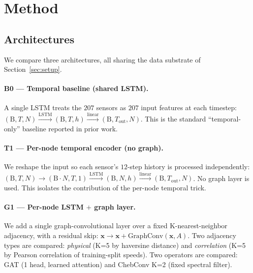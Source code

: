 \documentclass{article}
\begin{document}
\section{Method}
\label{sec:method}

\subsection{Architectures}
We compare three architectures, all sharing the data substrate of Section~\ref{sec:setup}.

\paragraph{B0 --- Temporal baseline (shared LSTM).}
A single LSTM treats the $207$ sensors as $207$ input features at each timestep:
$(\mathrm{B}, T, N) \xrightarrow{\text{LSTM}} (\mathrm{B}, T, h) \xrightarrow{\text{linear}} (\mathrm{B}, T_{\text{out}}, N)$.
This is the standard ``temporal-only'' baseline reported in prior work.

\paragraph{T1 --- Per-node temporal encoder (no graph).}
We reshape the input so each sensor's $12$-step history is processed independently:
$(\mathrm{B}, T, N) \to (\mathrm{B} \cdot N, T, 1) \xrightarrow{\text{LSTM}} (\mathrm{B}, N, h) \xrightarrow{\text{linear}} (\mathrm{B}, T_{\text{out}}, N)$.
No graph layer is used. This isolates the contribution of the per-node temporal trick.

\paragraph{G1 --- Per-node LSTM $+$ graph layer.}
We add a single graph-convolutional layer over a fixed K-nearest-neighbor adjacency, with a residual skip:
$\mathbf{x} \to \mathbf{x} + \mathrm{GraphConv}(\mathbf{x}, A)$.
Two adjacency types are compared: \emph{physical} (K=5 by haversine distance) and \emph{correlation} (K=5 by Pearson correlation of training-split speeds). Two operators are compared: GAT (1 head, learned attention) and ChebConv K=2 (fixed spectral filter).
\end{document}
